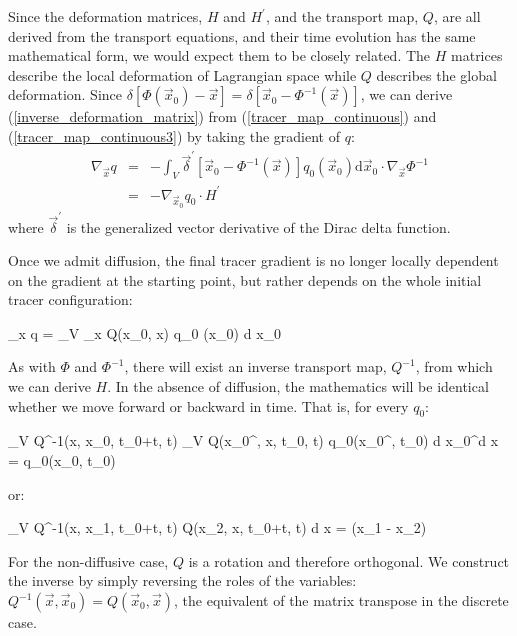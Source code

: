 Since the deformation matrices,
$H$ and $H^\prime$, and the transport map, $Q$, are all derived from the
transport equations, and their time evolution has the same mathematical form,
we would expect them to be closely related. 
The $H$ matrices describe the local deformation of Lagrangian space 
while $Q$ describes the global deformation.
Since $\delta \left [\Phi(\vec x_0) - \vec x \right ]=\delta \left [\vec x_0 - \Phi^{-1}(\vec x) \right ]$,
we can derive (\ref{inverse_deformation_matrix}) from
(\ref{tracer_map_continuous}) and (\ref{tracer_map_continuous3}) by taking 
the gradient of $q$:
\begin{eqnarray}
	\nabla_{\vec x} q & = & - \int_V \vec \delta^\prime \left [\vec x_0 - \Phi^{-1}(\vec x) \right ] q_0 (\vec x_0) \label{HfromQ1}
	\mathrm d \vec x_0 \cdot \nabla_{\vec x} \Phi^{-1} \\
	& = & - \nabla_{\vec x_0} q_0 \cdot H^\prime \label{HfromQ2}
\end{eqnarray}
where $\vec \delta^\prime$ is the generalized vector derivative of the 
Dirac delta function.

Once we admit diffusion, the final tracer gradient is no longer locally 
dependent on the gradient at the starting point, but rather depends on the
whole initial tracer configuration:
\begin{eqnl}
	\nabla_{\vec x} q = \int_V \nabla_{\vec x} Q(\vec x_0, \vec x) q_0 (\vec x_0) \mathrm d \vec x_0
\end{eqnl}

As with $\Phi$ and $\Phi^{-1}$, 
there will exist an inverse transport map, $Q^{-1}$, from which we can derive
$H$. In the absence of diffusion, the mathematics will be identical whether
we move forward or backward in time.
That is, for every $q_0$:
\begin{eqnl}
	\int_V Q^{-1}(\vec x, \vec x_0, t_0+\Delta t, \Delta t) 
	\int_V Q(\vec x_0^\prime, \vec x, t_0, \Delta t) 
	q_0(\vec x_0^\prime, t_0) 
	\mathrm d \vec x_0^\prime \mathrm d \vec x = q_0(\vec x_0, t_0)
\end{eqnl}
or:
\begin{eqanl}
	\int_V  Q^{-1}(\vec x, \vec x_1, t_0+\Delta t, \Delta t) Q(\vec x_2, \vec x, t_0+\Delta t, \Delta t) \mathrm d \vec x = \delta(\vec x_1 - \vec x_2)
\end{eqanl}
For the non-diffusive case, $Q$ is a rotation and therefore orthogonal.
We construct the inverse by simply reversing the roles of the variables:
$Q^{-1}(\vec x, \vec x_0) = Q(\vec x_0, \vec x)$, 
the equivalent of the matrix transpose in the discrete case.

